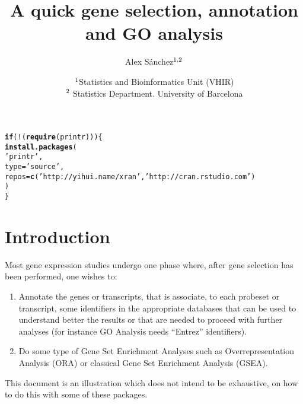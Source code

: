 \documentclass{article}\usepackage[]{graphicx}\usepackage[]{color}
\makeatletter
\newcommand{\hlstr}[1]{\textcolor[rgb]{0.192,0.494,0.8}{#1}}%
\newcommand{\hlopt}[1]{\textcolor[rgb]{0,0,0}{#1}}%
\newcommand{\hlstd}[1]{\textcolor[rgb]{0.345,0.345,0.345}{#1}}%
\newcommand{\hlkwa}[1]{\textcolor[rgb]{0.161,0.373,0.58}{\textbf{#1}}}%
\newcommand{\hlkwc}[1]{\textcolor[rgb]{0.333,0.667,0.333}{#1}}%
\newcommand{\hlkwd}[1]{\textcolor[rgb]{0.737,0.353,0.396}{\textbf{#1}}}%
\newenvironment{kframe}{%
 \def\at@end@of@kframe{}%
 \ifinner\ifhmode%
  \def\at@end@of@kframe{\end{minipage}}%
  \begin{minipage}{\columnwidth}%
 \fi\fi%
 \def\FrameCommand##1{\hskip\@totalleftmargin \hskip-\fboxsep
 \colorbox{shadecolor}{##1}\hskip-\fboxsep
     \hskip-\linewidth \hskip-\@totalleftmargin \hskip\columnwidth}%
 \MakeFramed {\advance\hsize-\width
   \@totalleftmargin\z@ \linewidth\hsize
   \@setminipage}}%
 {\par\unskip\endMakeFramed%
 \at@end@of@kframe}
\newenvironment{knitrout}{}{} %
\makeatother
\begin{document}
\title{A quick gene selection, annotation and GO analysis}
\author{Alex S\'anchez$\sp {1,2}$}
\date{$\sp 1$Statistics and Bioinformatics Unit (VHIR)\\
 $\sp 2$ Statistics Department. University of Barcelona}

\maketitle

\tableofcontents





\begin{knitrout}
\color{fgcolor}\begin{kframe}
\begin{alltt}
\hlkwa{if}\hlstd{(}\hlopt{!}\hlstd{(}\hlkwd{require}\hlstd{(printr))) \{}
  \hlkwd{install.packages}\hlstd{(}
    \hlstr{'printr'}\hlstd{,}
    \hlkwc{type} \hlstd{=} \hlstr{'source'}\hlstd{,}
    \hlkwc{repos} \hlstd{=} \hlkwd{c}\hlstd{(}\hlstr{'http://yihui.name/xran'}\hlstd{,} \hlstr{'http://cran.rstudio.com'}\hlstd{)}
  \hlstd{)}
\hlstd{\}}
\end{alltt}
\end{kframe}
\end{knitrout}


\section{Introduction}

Most gene expression studies undergo one phase where, after gene
selection has been performed, one wishes to:
\begin{enumerate}
\item Annotate the genes or transcripts, that is associate, to each
  probeset or transcript, some identifiers in the appropriate
  databases that can be used to understand better the results or that
  are needed to proceed with further analyses (for instance GO
  Analysis needs ``Entrez'' identifiers).
\item Do some type of Gene Set Enrichment Analyses such as
  Overrepresentation Analysis (ORA) or classical Gene Set Enrichment
  Analysis (GSEA).
\end{enumerate}

This document is an illustration which does not intend to be exhaustive, on how to do this with some of these packages.
\end{document}
